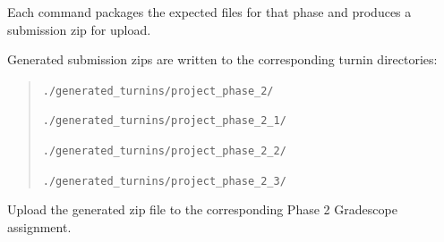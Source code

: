 \documentclass[12pt]{article}
\begin{document}
Each command packages the expected files for that phase and produces a submission zip for upload.

Generated submission zips are written to the corresponding turnin directories:
\begin{quote}
\texttt{./generated\_turnins/project\_phase\_2/}

\texttt{./generated\_turnins/project\_phase\_2\_1/}

\texttt{./generated\_turnins/project\_phase\_2\_2/}

\texttt{./generated\_turnins/project\_phase\_2\_3/}
\end{quote}

Upload the generated zip file to the corresponding Phase 2 Gradescope assignment.
\end{document}
